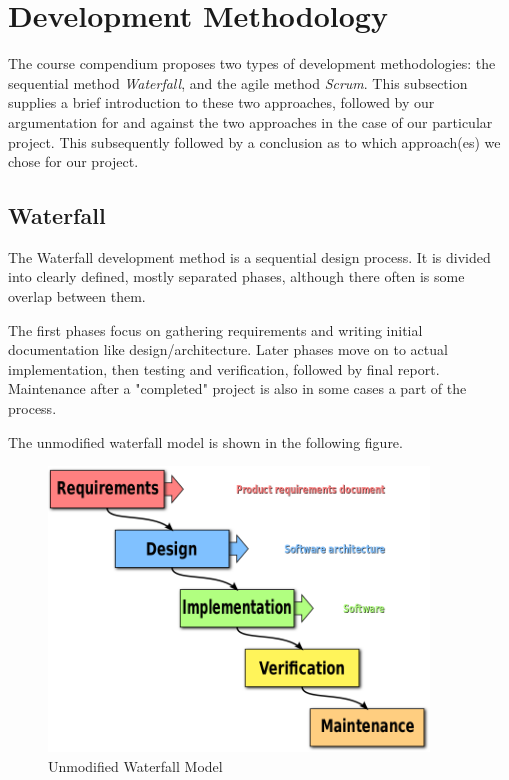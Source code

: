 \section{Development Methodology}
The course compendium proposes two types of development methodologies: the sequential method \emph{Waterfall}, and the agile method \emph{Scrum}. This subsection supplies a brief introduction to these two approaches, followed by our argumentation for and against the two approaches in the case of our particular project. This subsequently followed by a conclusion as to which approach(es) we chose for our project.

\newpage
\subsection{Waterfall}
The Waterfall development method is a sequential design process. It is divided into clearly defined, mostly separated phases, although there often is some overlap between them.

The first phases focus on gathering requirements and writing initial documentation like design/architecture. Later phases move on to actual implementation, then testing and verification, followed by final report. Maintenance after a "completed" project is also in some cases a part of the process.

The unmodified waterfall model is shown in the following figure.

\begin{figure}[H]
\centering
\includegraphics[width=0.9\textwidth]{images/Waterfall-model.png}
\caption{Unmodified Waterfall Model \cite{waterfallModel}}
\label{fig:Waterfall_model}
\end{figure}

